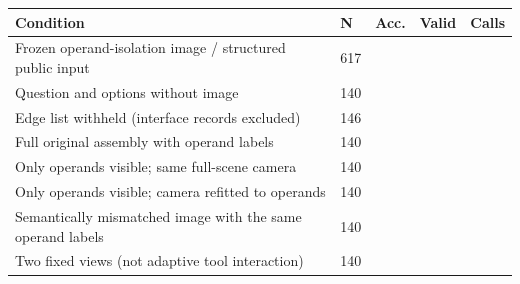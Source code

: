 \begin{tabularx}{\linewidth}{XXrrr}
\toprule
Condition & N & Acc. & Valid & Calls\\\midrule
Frozen operand-isolation image / structured public input & 617 &  &  & \\
Question and options without image & 140 &  &  & \\
Edge list withheld (interface records excluded) & 146 &  &  & \\
Full original assembly with operand labels & 140 &  &  & \\
Only operands visible; same full-scene camera & 140 &  &  & \\
Only operands visible; camera refitted to operands & 140 &  &  & \\
Semantically mismatched image with the same operand labels & 140 &  &  & \\
Two fixed views (not adaptive tool interaction) & 140 &  &  & \\
\bottomrule
\end{tabularx}
